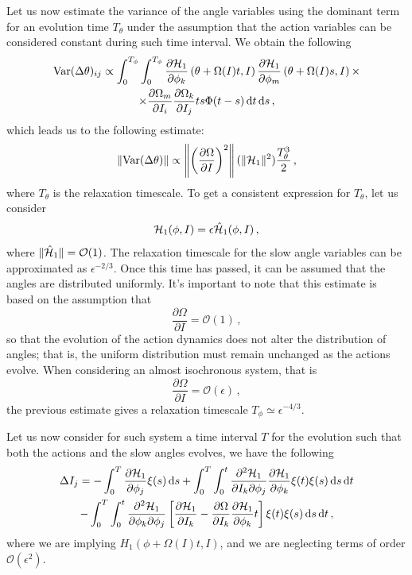 Let us now estimate the variance of the angle variables using the dominant term for an evolution time $T_\theta$ under the assumption that the action variables can be considered constant during such time interval. We obtain the following
\begin{multline}
    \operatorname{Var}(\Delta \theta)_{ij} \propto 
    \int_0^{T_\phi}\int_0^{T_\phi}  \pdv{\mathcal{H}_1}{\phi_k}\left(\theta+\Omega(I)t,I\right)
    \pdv{\mathcal{H}_1}{\phi_m}\left(\theta+\Omega(I)s,I\right)\times\\\times\pdv{\Omega_m}{I_i}\pdv{\Omega_k}{I_j} ts\Phi(t-s)\, \mathrm{d}t\, \mathrm{d}s \,,
\end{multline}
which leads us to the following estimate:
\begin{equation}
    \left \Vert \textrm{Var}(\Delta \theta)\right \Vert\propto \left \Vert \left (\frac{\partial \Omega}{\partial I}\right )^2 \right \Vert (\Vert \mathcal{H}_1\Vert^2)\frac{T_\theta^3}{2}\,,
\end{equation}
where $T_\theta$ is the relaxation timescale. To get a consistent expression for $T_\theta$, let us consider
\begin{equation}
    \mathcal{H}_1(\phi,I)=\epsilon \hat {\mathcal{H}}_1(\phi, I)\,,
\end{equation}
where $\Vert \hat {\mathcal{H}}_1 \Vert=\mathcal{O}(1)$. The relaxation timescale for the slow angle variables can be approximated as $\epsilon^{-2/3}$. Once this time has passed, it can be assumed that the angles are distributed uniformly. It's important to note that this estimate is based on the assumption that
\begin{equation}
    \frac{\partial \Omega}{\partial I}=\mathcal{O}(1)\,,
\end{equation}
so that the evolution of the action dynamics does not alter the distribution of angles; that is, the uniform distribution must remain unchanged as the actions evolve. When considering an almost isochronous system, that is
\begin{equation}
    \frac{\partial \Omega}{\partial I}=\mathcal{O}(\epsilon) \,,
\end{equation}
the previous estimate gives a relaxation timescale $T_\phi\simeq \epsilon^{-4/3}$.

Let us now consider for such system a time interval $T$ for the evolution such that both the actions and the slow angles evolves, we have the following
\begin{multline}
    \Delta I_j = -\int_0^T\pdv{\mathcal{H}_1}{\phi_j}\xi(s)\,\mathrm{d}s + \int_0^T\int_0^t
    \frac{\partial^2 \mathcal{H}_1}{\partial I_k\partial \phi_j}\pdv{\mathcal{H}_1}{\phi_k}\xi(t)\xi(s)\,\mathrm{d}s\,\mathrm{d}t \\
    - \int_0^T\int_0^t \frac{\partial^2 \mathcal{H}_1}{\partial \phi_k\partial \phi_j} \left [\pdv{\mathcal{H}_1}{I_k}-\pdv{\Omega}{I_k}
    \pdv{\mathcal{H}_1}{\phi_k}t \right ] \xi(t)\xi(s)\,\mathrm{d}s\,\mathrm{d}t \,,
\end{multline}
where we are implying $H_1(\phi+\Omega(I)t,I)$, and we are neglecting terms of order $\mathcal{O}(\epsilon^2)$.

